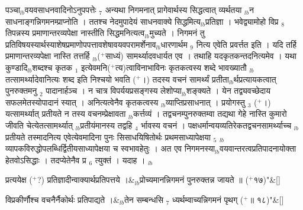 \documentclass[article,12pt,a4paper]{memoir}%
\newcommand{\add}[1]{($^{+}$#1)}
\newcounter{parCount}
\begin{document}
पञ्चा{\tiny $_{lb}$}वयवसाधनवादिनोऽनुपपत्तेः {\tiny $_{7}$} अन्यथा निगमनात् प्रागेवार्थस्य सिद्धत्वात् व्यर्थतया {\tiny $_{lb}$}न साधनाङ्गन्निगमनम्प्राप्नोति । ततश्च नेदमुपादेयं साधनवाक्ये सिद्धमित्य{\tiny $_{lb}$}प्रतिज्ञा । भवेद्व्यामोहो विप्र {\tiny $_{8}$} तिपन्नस्य प्रमाणान्तरव्यपेक्षा नास्तीति सिद्धमनित्यत्व{\tiny $_{lb}$}मुच्यते । निगमनं तु प्रतिविषयस्यार्थस्याशेषप्रमाणोपपत्तावशेषावयवपरामर्शेनाव{\tiny $_{lb}$}धारणार्थम {\tiny $_{9}$} \leavevmode{} नित्य एवेति प्रवर्त्तत इति । यदि तर्हि प्रमाणान्तरव्यपेक्षा नास्ति तत्तर्हि {\tiny $_{lb}$}\add{साध्यं} सामर्थ्यादवधार्यत एव । तथाहि यदकृतकन्तदनित्यमेव । यथा कुण्डादि{\tiny $_{lb}$}शब्दश्च कृतक {\tiny $_{1}$} इत्येवमनि\add{त्य}त्वाविनाभाविनः कृतकत्वस्य शब्दे भावख्यातौ {\tiny $_{lb}$}तत्सामर्थ्यादेवानित्यः शब्द इति निश्चयो भवति \add{।} तदस्य वचनं सामर्थ्यं प्रतीता{\tiny $_{lb}$}र्थप्रत्यायकत्वात् पुनरुक्तमनु {\tiny $_{2}$} पादानार्हञ्च । न चात्र विपर्ययप्रसङ्गस्य लेशोप्या{\tiny $_{lb}$}शङ्क्यते । येन तद्व्यवच्छेदाय सफलमेतस्योपादानं स्यात् । अनित्यत्वेनैव कृतकत्वस्य {\tiny $_{lb}$}व्याप्तिप्रसाधनात् । प्रयोगस्तु {\tiny $_{3}$} \add{।} यत्सामर्थ्यात् प्रतीयते न तस्य वचनम्प्रेक्षावता {\tiny $_{lb}$}कर्त्तव्यं । तद्वचनम्पुनरुक्तम्वा तद्यथा गेहे नास्ति कुमारो जीवति चेत्येतत्सामर्थ्यात् {\tiny $_{lb}$}प्रतीयंमानस्य तद्वहि {\tiny $_{4}$} र्भावस्य वचनं । पक्षधर्मान्वयव्यतिरेकतद्वचनसामर्थ्याच्च {\tiny $_{lb}$}प्रतीयते तस्मादनित्य एवेत्येवमादिना पुनः सिसाधयिषितोर्थः प्रथमसाध्यापेक्षया {\tiny $_{5}$} {\tiny $_{lb}$}व्यापकविरुद्धोपलब्धिर्द्वितीयसाध्यापेक्षया च स्वभावहेतुः । अत एव निगमनस्या{\tiny $_{lb}$}वयवान्तरत्वप्रतिपादनायोक्ता हेतवोऽसिद्धाः । तदप्येतेनैव प्र {\tiny $_{6}$} त्युक्तं । यदाह ।
	{}
	\pend%
      {\tiny $_{lb}$}
	  \bigskip
	  \begingroup
	
	    
	    \stanza[\smallbreak]
	  प्रत्ययेक्ष \add{?} प्रतिज्ञादीन्वाक्यार्थप्रतिपत्तये ।&{\tiny $_{lb}$}\leavevmode{}प्रोच्यमानन्निगमनं पुनरुक्तन्न जायते ॥ \add{१७}{\normalfontlatin\large\qquad{}"}\&[\smallbreak]
	  
	  
	  
	  \endgroup
	
	  \bigskip
	  \begingroup
	
	    
	    \stanza[\smallbreak]
	  विप्रकीर्णौश्च वचनैर्नैकोर्थः प्रतिपाद्यते ।&{\tiny $_{lb}$}तेन सम्बन्धसि {\tiny $_{7}$} ध्यर्थम्वाच्यन्निगमनं पृथग् \add{॥ १८}{\normalfontlatin\large\qquad{}"}\&[\smallbreak]
	  
\end{document}
